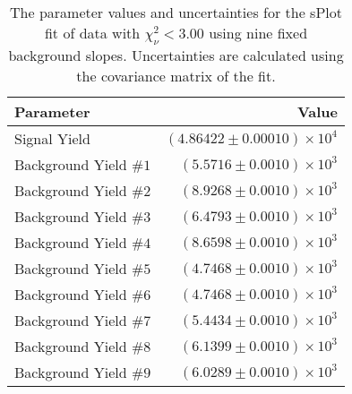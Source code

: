 
\begin{table}[ht]
    \begin{center}
        \begin{tabular}{lr}\toprule
            Parameter & Value \\\midrule
            Signal Yield & $(4.86422 \pm 0.00010) \times 10^{4}$ \\
            Background Yield $\#1$ & $(5.5716 \pm 0.0010) \times 10^{3}$ \\
            Background Yield $\#2$ & $(8.9268 \pm 0.0010) \times 10^{3}$ \\
            Background Yield $\#3$ & $(6.4793 \pm 0.0010) \times 10^{3}$ \\
            Background Yield $\#4$ & $(8.6598 \pm 0.0010) \times 10^{3}$ \\
            Background Yield $\#5$ & $(4.7468 \pm 0.0010) \times 10^{3}$ \\
            Background Yield $\#6$ & $(4.7468 \pm 0.0010) \times 10^{3}$ \\
            Background Yield $\#7$ & $(5.4434 \pm 0.0010) \times 10^{3}$ \\
            Background Yield $\#8$ & $(6.1399 \pm 0.0010) \times 10^{3}$ \\
            Background Yield $\#9$ & $(6.0289 \pm 0.0010) \times 10^{3}$ \\\bottomrule
        \end{tabular}
        \caption{The parameter values and uncertainties for the sPlot fit of data with $\chi^2_\nu < 3.00$ using nine fixed background slopes. Uncertainties are calculated using the covariance matrix of the fit.}\label{tab:splot-fit-results-chisqdof-3.00-fixed-9}
    \end{center}
\end{table}
